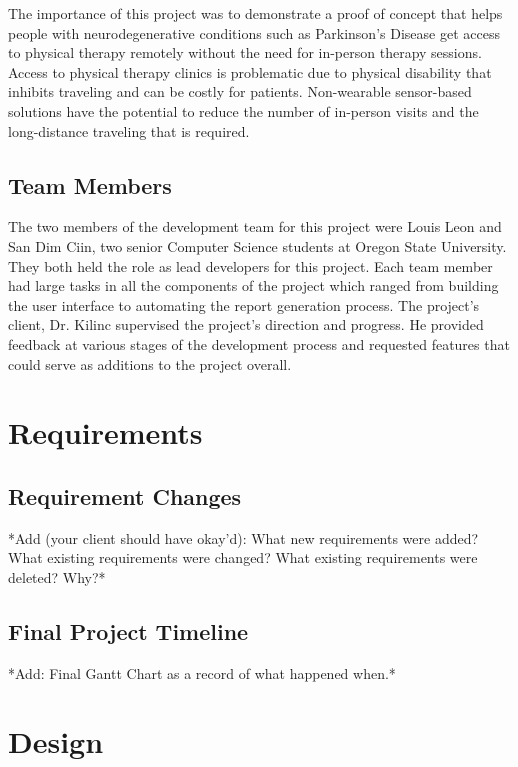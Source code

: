 \documentclass[onecolumn, draftclsnofoot,10pt, compsoc]{IEEEtran}
\begin{document}
The importance of this project was to demonstrate a proof of concept that helps people with neurodegenerative conditions such as Parkinson's Disease get access to physical therapy remotely without the need for in-person therapy sessions. Access to physical therapy clinics is problematic due to physical disability that inhibits traveling and can be costly for patients. Non-wearable sensor-based solutions have the potential to reduce the number of in-person visits and the long-distance traveling that is required. 

\subsection{Team Members}
The two members of the development team for this project were Louis Leon and San Dim Ciin, two senior Computer Science students at Oregon State University. They both held the role as lead developers for this project. Each team member had large tasks in all the components of the project which ranged from building the user interface to automating the report generation process. The project's client, Dr. Kilinc supervised the project's direction and progress. He provided feedback at various stages of the development process and requested features that could serve as additions to the project overall. 
\section{Requirements}
  

\subsection{Requirement Changes}
*Add (your client should have okay'd): What new requirements were added? What existing requirements were changed? What existing requirements were deleted? Why?* 
\subsection{Final Project Timeline}
*Add: Final Gantt Chart as a record of what happened when.* 

\section{Design}
  
\end{document}
